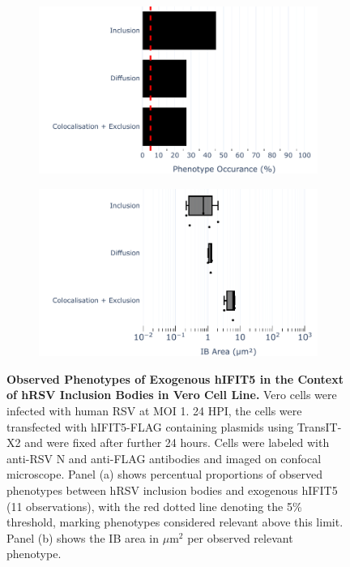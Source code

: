 \begin{figure}
    \begin{subfigure}{0.495\textwidth}
        \caption{}
        \includegraphics[width=1\linewidth]{09. Chapter 4/Figs/02. Overexpression/04. IFIT5/01. bar_i5_hrsv.pdf} 
    \end{subfigure}
    \begin{subfigure}{0.495\textwidth}
        \caption{}
        \includegraphics[width=1\linewidth]{09. Chapter 4/Figs/02. Overexpression/04. IFIT5/02. box_i5_hrsv.pdf}
    \end{subfigure}
    \caption[Observed Phenotypes of Exogenous hIFIT5 in the Context of hRSV Inclusion Bodies in Vero Cell Line.]{\textbf{Observed Phenotypes of Exogenous hIFIT5 in the Context of hRSV Inclusion Bodies in Vero Cell Line.} Vero cells were infected with human RSV at MOI 1. 24 HPI, the cells were transfected with hIFIT5-FLAG containing plasmids using TransIT-X2 and were fixed after further 24 hours. Cells were labeled with anti-RSV N and anti-FLAG antibodies and imaged on confocal microscope. Panel (a) shows percentual proportions of observed phenotypes between hRSV inclusion bodies and exogenous hIFIT5 (11 observations), with the red dotted line denoting the 5\% threshold, marking phenotypes considered relevant above this limit. Panel (b) shows the IB area in \(\mu \mbox{m}^2\) per observed relevant phenotype.}
    \label{fig:Observed Phenotypes of Exogenous hIFIT5 in the Context of hRSV Inclusion Bodies in VERO Cell Line}
\end{figure}


